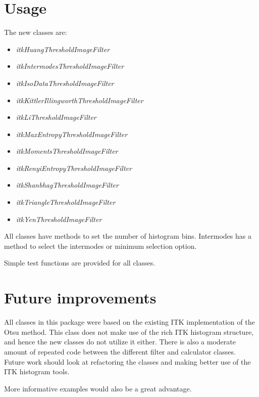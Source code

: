 \documentclass{InsightArticle}
\begin{document}
\section{Usage}
The new classes are:
\begin{itemize}
\item {\em itkHuangThresholdImageFilter}
\item {\em itkIntermodesThresholdImageFilter}
\item {\em itkIsoDataThresholdImageFilter}
\item {\em itkKittlerIllingworthThresholdImageFilter}
\item {\em itkLiThresholdImageFilter}
\item {\em itkMaxEntropyThresholdImageFilter}
\item {\em itkMomentsThresholdImageFilter}
\item {\em itkRenyiEntropyThresholdImageFilter}
\item {\em itkShanbhagThresholdImageFilter}
\item {\em itkTriangleThresholdImageFilter}
\item {\em itkYenThresholdImageFilter}
\end{itemize}
All classes have methods to set the number of histogram
bins. Intermodes has a method to select the intermodes or minimum
selection option.

Simple test functions are provided for all classes. 



\section{Future improvements}
All classes in this package were based on the existing ITK
implementation of the Otsu method. This class does not make use of the
rich ITK histogram structure, and hence the new classes do not utilize
it either. There is also a moderate amount of repeated code between
the different filter and calculator classes. Future work should look
at refactoring the classes and making better use of the ITK histogram
tools.

More informative examples would also be a great advantage.
\end{document}
